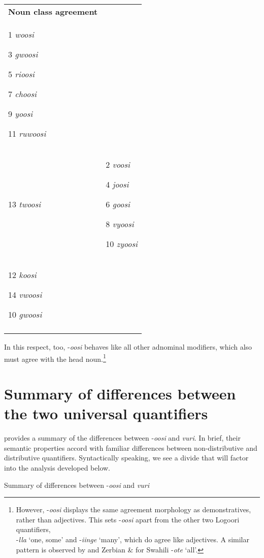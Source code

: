 \documentclass[output=paper]{langsci/langscibook}
\begin{document}
\begin{tabularx}{\textwidth}{XX}
\lsptoprule
\hhline{-~}
{\bfseries Noun class agreement} & \\
1  \textit{woosi}

3  \textit{gwoosi}  

5  \textit{rioosi}

7  \textit{choosi}

9  \textit{yoosi}

11  \textit{ruwoosi}\\
13  \textit{twoosi} & 2  \textit{voosi}

4  \textit{joosi}

6  \textit{goosi}

8  \textit{vyoosi}

10  \textit{zyoosi}\\
12  \textit{koosi}    

14  \textit{vwoosi}

10  \textit{gwoosi}\\
\lspbottomrule
\end{tabularx}
In this respect, too, -\textit{oosi} behaves like all other adnominal modifiers, which also must agree with the head noun.\footnote{ However, -\textit{oosi} displays the same agreement morphology as demonstratives, rather than adjectives. This sets -\textit{oosi} apart from the other two Logoori quantifiers, \\
{}-\textit{lla} ‘one, some’ and -\textit{iinge} ‘many’, which do agree like adjectives. A similar pattern is observed by \citet{Krifka1995} and Zerbian \& \citet{Krifka2008} for Swahili -\textit{ote} ‘all’.
} 

\section{Summary of differences between the two universal quantifiers}

 provides a summary of the differences between -\textit{oosi} and \textit{vuri}. In brief, their semantic properties accord with familiar differences between non-distributive and distributive\textit{ }quantifiers. Syntactically speaking, we see a divide that will factor into the analysis developed below.

\begin{stylelsTableHeading}%
\begin{table}
\caption{Summary of differences between -\textit{oosi }and \textit{vuri}}
\label{tab:2}
\end{table}\end{stylelsTableHeading}
\end{document}
